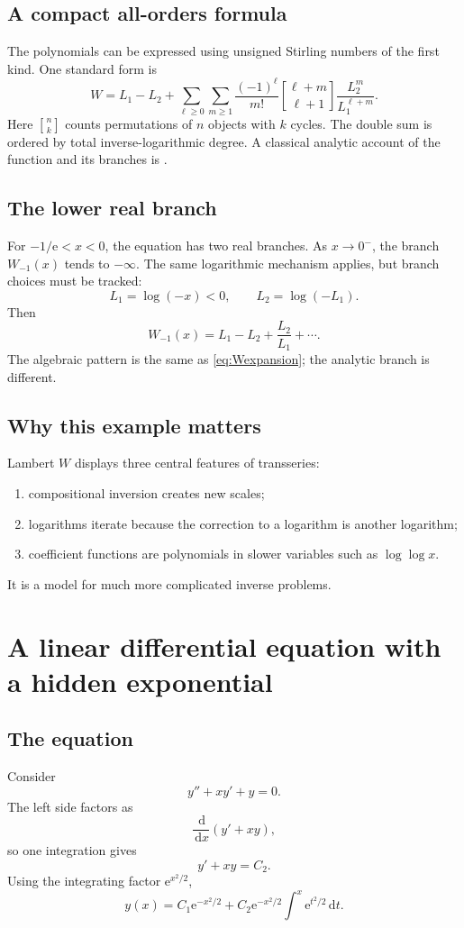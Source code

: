 \documentclass[11pt,openany]{book}
\theoremstyle{plain}
\theoremstyle{definition}
\theoremstyle{remark}
\newcommand{\dd}{\,\mathrm{d}}
\newcommand{\e}{\mathrm{e}}
\begin{document}
\section{A compact all-orders formula}
The polynomials can be expressed using unsigned Stirling numbers of the first kind. One standard form is
\[
 W=L_1-L_2+
 \sum_{\ell\ge0}\sum_{m\ge1}
 \frac{(-1)^\ell}{m!}
 \genfrac{[}{]}{0pt}{}{\ell+m}{\ell+1}
 \frac{L_2^m}{L_1^{\ell+m}}.
\]
Here $\genfrac{[}{]}{0pt}{}{n}{k}$ counts permutations of $n$ objects with $k$ cycles. The double sum is ordered by total inverse-logarithmic degree. A classical analytic account of the function and its branches is \cite{Corless1996}.

\section{The lower real branch}
For $-1/\e<x<0$, the equation has two real branches. As $x\to0^-$, the branch $W_{-1}(x)$ tends to $-\infty$. The same logarithmic mechanism applies, but branch choices must be tracked:
\[
  L_1=\log(-x)<0,
  \qquad
  L_2=\log(-L_1).
\]
Then
\[
  W_{-1}(x)
  =L_1-L_2+\frac{L_2}{L_1}+\cdots.
\]
The algebraic pattern is the same as \cref{eq:Wexpansion}; the analytic branch is different.

\section{Why this example matters}
Lambert $W$ displays three central features of transseries:
\begin{enumerate}
\item compositional inversion creates new scales;
\item logarithms iterate because the correction to a logarithm is another logarithm;
\item coefficient functions are polynomials in slower variables such as $\log\log x$.
\end{enumerate}
It is a model for much more complicated inverse problems.

\chapter{A linear differential equation with a hidden exponential}
\label{chap:linearODE}

\section{The equation}
Consider
\[
  y''+xy'+y=0.
  \label{eq:linearhidden}
\]
The left side factors as
\[
  \frac{\dd}{\dd x}(y'+xy),
\]
so one integration gives
\[
  y'+xy=C_2.
\]
Using the integrating factor $\e^{x^2/2}$,
\[
  y(x)=C_1\e^{-x^2/2}
  +C_2\e^{-x^2/2}\int^x\e^{t^2/2}\dd t.
\]
\end{document}
